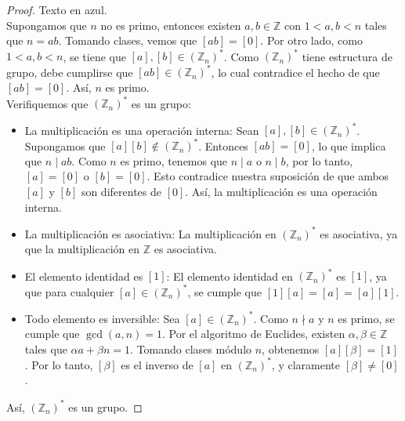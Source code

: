 \begin{proposicion} \label{jkhgdvnjf}
\end{proposicion}

\begin{proof}
	{\color{white} Texto en azul.}\\
	
	\noindent [$\Rightarrow$] Supongamos que \(n\) no es primo, entonces existen \(a, b \in \mathbb{Z}\) con \(1 < a, b < n\) tales que \(n = ab\). Tomando clases, vemos que \([ab] = [0]\). Por otro lado, como \(1 < a, b < n\), se tiene que \([a], [b] \in (\mathbb{Z}_n)^\ast\). Como \((\mathbb{Z}_n)^\ast\) tiene estructura de grupo, debe cumplirse que \([ab] \in (\mathbb{Z}_n)^\ast\), lo cual contradice el hecho de que \([ab] = [0]\). Así, \(n\) es primo.\\
	
	\noindent [$\Leftarrow$] Verifiquemos que \((\mathbb{Z}_n)^\ast\) es un grupo:
	\begin{itemize}
		\item La multiplicación es una operación interna: Sean \( [a], [b] \in (\mathbb{Z}_n)^\ast\). Supongamos que \( [a][b] \notin (\mathbb{Z}_n)^\ast \). Entonces \( [ab] = [0] \), lo que implica que \( n \mid ab \). Como \( n \) es primo, tenemos que \( n \mid a \) o \( n \mid b \), por lo tanto, \( [a] = [0] \) o \( [b] = [0] \). Esto contradice nuestra suposición de que ambos \( [a] \) y \( [b] \) son diferentes de \( [0] \). Así, la multiplicación es una operación interna.
		
		\item La multiplicación es asociativa: La multiplicación en \( (\mathbb{Z}_n)^\ast \) es asociativa, ya que la multiplicación en \( \mathbb{Z} \) es asociativa.
		
		\item El elemento identidad es \( [1] \): El elemento identidad en \( (\mathbb{Z}_n)^\ast \) es \( [1] \), ya que para cualquier \( [a] \in (\mathbb{Z}_n)^\ast \), se cumple que \( [1][a] = [a] = [a][1] \).
		
		\item Todo elemento es inversible: Sea \( [a] \in (\mathbb{Z}_n)^\ast \). Como \( n \nmid a \) y \( n \) es primo, se cumple que \( \gcd(a, n) = 1 \). Por el algoritmo de Euclides, existen \( \alpha, \beta \in \mathbb{Z} \) tales que \( \alpha a + \beta n = 1 \). Tomando clases módulo \(n\), obtenemos \( [a][\beta] = [1] \). Por lo tanto, \( [\beta] \) es el inverso de \( [a] \) en \( (\mathbb{Z}_n)^\ast \), y claramente \( [\beta] \neq [0] \).
	\end{itemize}
	Así, \( (\mathbb{Z}_n)^\ast \) es un grupo.
\end{proof}



